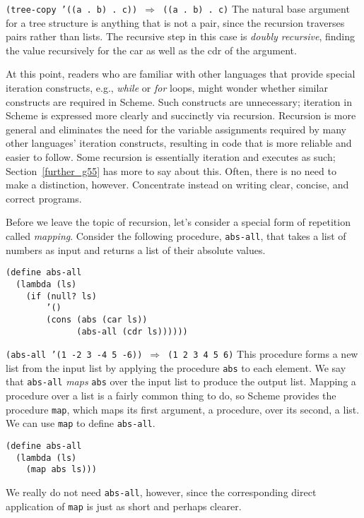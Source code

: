 \texttt{(tree-copy '((a . b) . c)) \(\Rightarrow\) ((a . b) . c)}
The natural base argument for a tree structure is anything that is not a
pair, since the recursion traverses pairs rather than lists.
The recursive step in this case is \textit{doubly recursive}, finding the
value recursively for the car as well as the cdr of the argument.


At this point, readers who are familiar with other languages that provide
special iteration constructs, e.g., \textit{while} or \textit{for} loops, might
wonder whether similar constructs are required in Scheme.
Such constructs are unnecessary; \label{start_s145}iteration in Scheme
is expressed more clearly and succinctly via recursion.
Recursion is more general and eliminates the need for the variable
assignments required by many other languages' iteration constructs,
resulting in code that is more reliable and easier to follow.
Some recursion is essentially iteration and executes as such;
Section \ref{further_g55} has more to say about this.
Often, there is no need to make a distinction, however.
Concentrate instead on writing clear, concise, and correct programs.


Before we leave the topic of recursion, let's consider a special form of
repetition called \label{start_s146}\textit{mapping}.
Consider the following procedure, \texttt{abs-all}, that takes a list of
numbers as input and returns a list of their absolute values.


\begin{alltt}
(define abs-all
  (lambda (ls)
    (if (null? ls)
        '()
        (cons (abs (car ls))
              (abs-all (cdr ls))))))
\end{alltt}


\texttt{(abs-all '(1 -2 3 -4 5 -6)) \(\Rightarrow\) (1 2 3 4 5 6)}
This procedure forms a new list from the input list by applying the
procedure \texttt{abs} to each element.
We say that \texttt{abs-all} \textit{maps} \texttt{abs} over the input list to
produce the output list.
Mapping a procedure over a list is a fairly common thing to do, so Scheme
provides the procedure \texttt{map}, which maps its first argument,
a procedure, over its second, a list.
We can use \label{start_s147}\texttt{map} to define \texttt{abs-all}.


\begin{alltt}
(define abs-all
  (lambda (ls)
    (map abs ls)))
\end{alltt}


We really do not need \texttt{abs-all}, however, since the corresponding
direct application of \texttt{map} is just as short and perhaps clearer.


